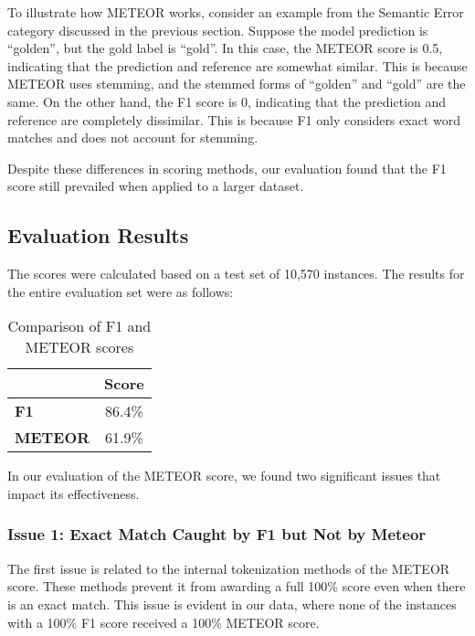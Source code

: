 \documentclass{article}
\begin{document}
To illustrate how METEOR works, consider an example from the
Semantic Error category discussed in the previous section. Suppose
the model prediction is ``golden'', but the gold label is ``gold''.
In this case, the METEOR score is 0.5, indicating that the prediction
and reference are somewhat similar. This is because METEOR uses
stemming, and the stemmed forms of ``golden'' and ``gold'' are the same.
On the other hand, the F1 score is 0, indicating that the prediction
and reference are completely dissimilar. This is because F1 only
considers exact word matches and does not account for stemming.

Despite these differences in scoring methods, our evaluation found that
the F1 score still prevailed when applied to a larger dataset.

\subsection{Evaluation Results}

The scores were calculated based on a test set of 10,570 instances.
The results for the entire evaluation set were as follows:

\begin{table}[H]
  \centering
  \begin{tabular}{lc}
  \toprule
   & \textbf{Score} \\
  \midrule
  \textbf{F1} & 86.4\% \\
  \textbf{METEOR} & 61.9\% \\
  \bottomrule
  \end{tabular}
  \caption{Comparison of F1 and METEOR scores}
  \label{tab:scores}
\end{table}

In our evaluation of the METEOR score, we found two significant issues
that impact its effectiveness.

\subsubsection*{Issue 1: Exact Match Caught by F1 but Not by Meteor}

The first issue is related to the internal tokenization methods of the
METEOR score. These methods prevent it from awarding a full 100\% score
even when there is an exact match. This issue is evident in our data,
where none of the instances with a 100\% F1 score received a 100\%
METEOR score.
\end{document}
